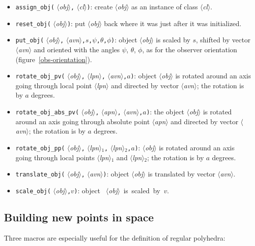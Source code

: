 \documentclass[nonumber,harvardcite]{ltugboat}
\DeclareRobustCommand\meta[1]{%
       \ensuremath{\langle}\emph{#1}\ensuremath{\rangle}}
\newcommand{\AVN}{\meta{avn}}
\newcommand{\APN}{\meta{apn}}
\newcommand{\LPN}{\meta{lpn}}
\newcommand{\CN}{\meta{cl}}
\newcommand{\IN}{\meta{obj}}
\newcommand{\tc}{\texttt{,}}
\begin{document}
\begin{itemize}
\item \verb|assign_obj(|\IN\tc\CN\verb|)|: 
           create \IN{} as an instance of class \CN.
\item \verb|reset_obj(|\IN\verb|)|: put \IN{} back where it 
      was just after it was initialized.
\item \verb|put_obj(|\IN\tc\AVN\tc$s$\tc$\psi$\tc$\theta$\tc$\phi$\verb|)|:
    object \IN{} is scaled by $s$, shifted by vector \AVN{} and
    oriented with the angles $\psi$, $\theta$, $\phi$,
    as for the observer orientation (figure~\ref{obs-orientation}).
\item \verb|rotate_obj_pv(|\IN\tc\LPN\tc\AVN\tc$a$\verb|)|:
    object \IN{} is rotated
    around an axis going through local point \LPN{}
    and directed by vector \AVN; the rotation is by $a$ degrees.
\item \verb|rotate_obj_abs_pv(|\IN\tc\APN\tc\AVN\tc$a$\verb|)|:\break
    the object \IN{} is rotated around an axis going through absolute 
    point \APN{} and directed by vector \AVN; the rotation is by $a$ degrees.
\item \verb|rotate_obj_pp(|\IN\tc\LPN$_1$\tc\LPN$_2$\tc$a$\verb|)|:
    \IN{} is rotated around an axis going through local points
    \LPN$_1$ and \LPN$_2$; the rotation is by $a$ degrees.
\item \verb|translate_obj(|\IN\tc\AVN\verb|)|: object \IN{} is translated
    by vector \AVN.
\item \verb|scale_obj(|\IN\tc$v$\verb|)|: object~\IN{}~is~scaled~by~$v$.
\end{itemize}

\subsection{Building new points in space}

Three macros are especially useful for the definition of regular polyhedra:
\end{document}
